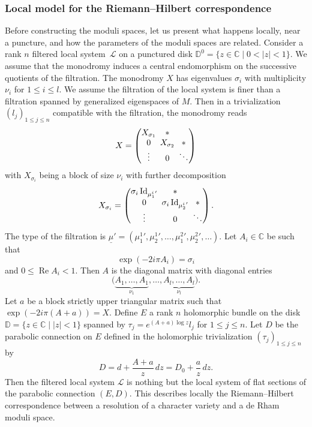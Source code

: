\documentclass[11pt]{article}
\theoremstyle{definition}
\theoremstyle{plain}
\DeclareMathOperator{\Id}{Id}
\DeclareMathOperator{\Ree}{Re}
\newcommand{\C}{\mathbb{C}}
\begin{document}
\subsubsection{Local model for the Riemann--Hilbert correspondence}\label{subsub_local_RH}
Before constructing the moduli spaces, let us present what happens locally, near a puncture, and how the parameters of the moduli spaces are related. Consider a rank $n$ filtered local system~$\mathcal{L}$ on a punctured disk $\mathbb{D}^0=\lbrace z\in \mathbb{C} \mid 0 < |z|< 1\rbrace$. We assume that the monodromy induces a central endomorphism on the successive quotients of the filtration. The monodromy $X$ has eigenvalues $\sigma_i$ with multiplicity $\nu_i$ for $1\le i \le l$. We assume the filtration of the local system is finer than a filtration spanned by generalized eigenspaces of $M$. Then in a trivialization $(l_j)_{1\le j \le n}$ compatible with the filtration, the monodromy reads
\[\arraycolsep2.5pt
X =
\begin{pmatrix}
X_{\sigma_1} & *& \\
0 & X_{\sigma_2} & *\\
\vdots & 0 & \ddots
\end{pmatrix}
\]
with $X_{\sigma_i}$ being a block of size $\nu_i$ with further decomposition
\[\arraycolsep2.5pt
X_{\sigma_i} =
\begin{pmatrix}
\sigma_i \Id_{{\mu^i_1}'} & *& \\
0 & \sigma_i \Id_{{\mu^i_2}'} & *\\
\vdots & 0 & \ddots
\end{pmatrix}.
\]
The type of the filtration is $\underline{\mu}'=({\mu^1_1}',{\mu^1_2}',\dots,{\mu^2_1}',{\mu^2_2}',\dots)$. Let $A_i \in \C$ be such that
\[
\exp(- 2 i \pi A_i)=\sigma_i
\]
and $0 \le \Ree A_i<1$. Then $A$ is the diagonal matrix with diagonal entries
\[
\bigl(\underbrace{A_1,\dots,A_1}_{\nu_1},\dots,\underbrace{A_l,\dots,A_l}_{\nu_l}\bigr).
\]
Let $a$ be a block strictly upper triangular matrix such that $\exp\left(-2i\pi (A+a)\right)=X$. Define $E$ a rank $n$ holomorphic bundle on the disk $\mathbb{D}=\lbrace z\in\mathbb{C} \mid |z|<1\rbrace$ spanned by $\tau_j=e^{(A+a) \log z} l_j$ for $1\le j\le n$. Let $D$ be the parabolic connection on $E$ defined in the holomorphic trivialization $(\tau_j)_{1\le j\le n}$ by
\[
D = d + \frac{A+a}{z}\, dz = D_0 + \frac{a}{z}\, dz.
\]
Then the filtered local system $\mathcal{L}$ is nothing but the local system of flat sections of the parabolic connection $(E,D)$. This describes locally the Riemann--Hilbert correspondence between a resolution of a character variety and a de Rham moduli space.
\end{document}
